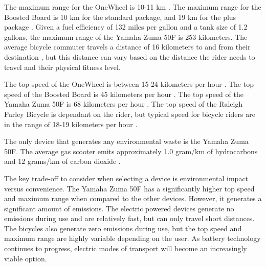 The maximum range for the OneWheel is 10-11 km \cite{wheelcost}.
The maximum range for the Boosted Board is 10 km for the standard package, and 19 km for the plus package \cite{boardcost}.
Given a fuel efficiency of 132 miles per gallon and a tank size of 1.2 gallons, the maximum range of the Yamaha Zuma 50F is 253 kilometers.
The average bicycle commuter travels a distance of 16 kilometers to and from their destination \cite{BikePaper}, but this distance can vary based on the distance the rider needs to travel and their physical fitness level.
\par
The top speed of the OneWheel is between 15-24 kilometers per hour \cite{wheelcost}.
The top speed of the Boosted Board is 45 kilometers per hour \cite{boardcost}.
The top speed of the Yamaha Zuma 50F is 68 kilometers per hour \cite{Yamaha}.
The top speed of the Raleigh Furley Bicycle is dependant on the rider, but typical speed for bicycle riders are in the range of 18-19 kilometers per hour \cite{bikespeed}.
\par
The only device that generates any environmental waste is the Yamaha Zuma 50F. The average gas scooter emits approximately 1.0 gram/km of hydrocarbons and 12 grams/km of carbon dioxide \cite{emissions}.
\par
The key trade-off to consider when selecting a device is environmental impact versus convenience.
The Yamaha Zuma 50F has a significantly higher top speed and maximum range when compared to the other devices. 
However, it generates a significant amount of emissions. The electric powered devices generate no emissions during use and are relatively fast, but can only travel short distances. 
The bicycles also generate zero emissions during use, but the top speed and maximum range are highly variable depending on the user.
As battery technology continues to progress, electric modes of transport will become an increasingly viable option.